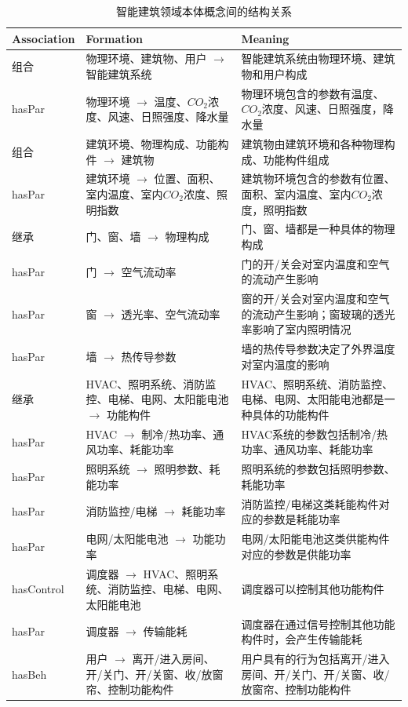 	\begin{table}[!t]
	\scriptsize
	\renewcommand{\arraystretch}{1.4}
	\caption{智能建筑领域本体概念间的结构关系}
	\label{ontology_relation}
	\centering
	\begin{tabular}{p{2cm}p{4.5cm}p{7.5cm}}
	\hline
	Association & Formation & Meaning \\
	\hline
	组合 & 物理环境、建筑物、用户 $\rightarrow$ 智能建筑系统 & 智能建筑系统由物理环境、建筑物和用户构成 \\
	hasPar & 物理环境 $\rightarrow$ 温度、$CO_{2}$浓度、风速、日照强度、降水量 & 物理环境包含的参数有温度、$CO_{2}$浓度、风速、日照强度，降水量\\
	组合 & 建筑环境、物理构成、功能构件 $\rightarrow$ 建筑物 & 建筑物由建筑环境和各种物理构成、功能构件组成\\
	hasPar & 建筑环境 $\rightarrow$ 位置、面积、室内温度、室内$CO_{2}$浓度、照明指数 & 建筑物环境包含的参数有位置、面积、室内温度、室内$CO_{2}$浓度，照明指数\\
	继承 & 门、窗、墙 $\rightarrow$ 物理构成 & 门、窗、墙都是一种具体的物理构成\\
	hasPar & 门 $\rightarrow$ 空气流动率 & 门的开/关会对室内温度和空气的流动产生影响\\
	hasPar & 窗 $\rightarrow$ 透光率、空气流动率 & 窗的开/关会对室内温度和空气的流动产生影响；窗玻璃的透光率影响了室内照明情况\\
	hasPar & 墙 $\rightarrow$ 热传导参数 & 墙的热传导参数决定了外界温度对室内温度的影响\\
	继承 & HVAC、照明系统、消防监控、电梯、电网、太阳能电池 $\rightarrow$ 功能构件 & HVAC、照明系统、消防监控、电梯、电网、太阳能电池都是一种具体的功能构件\\
	hasPar & HVAC $\rightarrow$ 制冷/热功率、通风功率、耗能功率 & HVAC系统的参数包括制冷/热功率、通风功率、耗能功率\\
	hasPar & 照明系统 $\rightarrow$ 照明参数、耗能功率 & 照明系统的参数包括照明参数、耗能功率\\
	hasPar & 消防监控/电梯 $\rightarrow$ 耗能功率 & 消防监控/电梯这类耗能构件对应的参数是耗能功率\\
	hasPar & 电网/太阳能电池 $\rightarrow$ 功能功率 & 电网/太阳能电池这类供能构件对应的参数是供能功率\\
	hasControl & 调度器 $\rightarrow$ HVAC、照明系统、消防监控、电梯、电网、太阳能电池 & 调度器可以控制其他功能构件\\
	hasPar & 调度器 $\rightarrow$ 传输能耗 & 调度器在通过信号控制其他功能构件时，会产生传输能耗\\
	hasBeh & 用户 $\rightarrow$ 离开/进入房间、开/关门、开/关窗、收/放窗帘、控制功能构件 & 用户具有的行为包括离开/进入房间、开/关门、开/关窗、收/放窗帘、控制功能构件\\
	\hline
	\end{tabular}
	\end{table}
	
